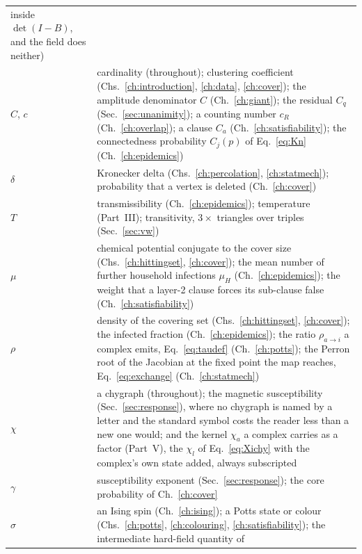 \begin{longtable}{@{}L{1.28in}@{\hspace{0.8em}}L{2.48in}@{}}
      inside $\det(I-B)$, and the field does neither)\\[3pt]
$C$, $c$ & cardinality (throughout); clustering coefficient
           (Chs.~\ref{ch:introduction}, \ref{ch:data}, \ref{ch:cover}); the amplitude
           denominator $C$ (Ch.~\ref{ch:giant}); the residual $C_{q}$
           (Sec.~\ref{sec:unanimity}); a counting number $c_{R}$
           (Ch.~\ref{ch:overlap}); a clause $C_{a}$
           (Ch.~\ref{ch:satisfiability}); the connectedness probability
           $C_{j}(p)$ of Eq.~\eqref{eq:Kn}
           (Ch.~\ref{ch:epidemics})\\[3pt]
$\delta$ & Kronecker delta (Chs.~\ref{ch:percolation}, \ref{ch:statmech});
           probability that a vertex is deleted (Ch.~\ref{ch:cover})\\[3pt]
$T$ & transmissibility (Ch.~\ref{ch:epidemics}); temperature (Part~III);
      transitivity, $3\times$ triangles over triples (Sec.~\ref{sec:vw})\\[3pt]
$\mu$ & chemical potential conjugate to the cover size
        (Chs.~\ref{ch:hittingset}, \ref{ch:cover}); the mean number of further
        household infections $\mu_{H}$ (Ch.~\ref{ch:epidemics}); the weight
        that a layer-2 clause forces its sub-clause false
        (Ch.~\ref{ch:satisfiability})\\[3pt]
$\rho$ & density of the covering set (Chs.~\ref{ch:hittingset},
         \ref{ch:cover}); the infected fraction
         (Ch.~\ref{ch:epidemics}); the ratio $\rho_{a\to i}$ a complex emits,
         Eq.~\eqref{eq:taudef} (Ch.~\ref{ch:potts}); the Perron root of the
         Jacobian at the fixed point the map reaches, Eq.~\eqref{eq:exchange}
         (Ch.~\ref{ch:statmech})\\[3pt]
$\chi$ & a chygraph (throughout); the magnetic susceptibility
         (Sec.~\ref{sec:response}), where no chygraph is named by a
         letter and the standard symbol costs the reader less than a new one
         would; and the kernel $\chi_{a}$ a complex carries as a factor
         (Part~V), the $\chi_{l}$ of Eq.~\eqref{eq:Xichy} with the
         complex's own state added, always subscripted\\[3pt]
$\gamma$ & susceptibility exponent (Sec.~\ref{sec:response}); the core
           probability of Ch.~\ref{ch:cover}\\[3pt]
$\sigma$ & an Ising spin (Ch.~\ref{ch:ising}); a Potts state or colour
           (Chs.~\ref{ch:potts}, \ref{ch:colouring},
           \ref{ch:satisfiability}); the intermediate hard-field quantity of

\end{longtable}
